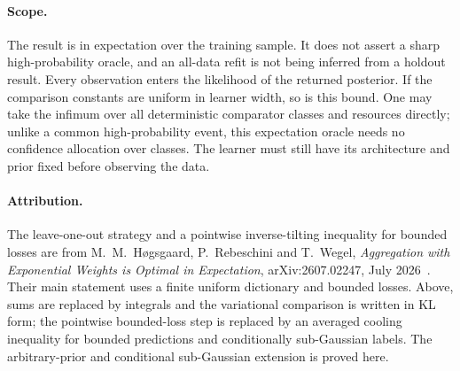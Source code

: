 \paragraph{Scope.}
The result is in expectation over the training sample. It does not
assert a sharp high-probability oracle, and an all-data refit is not
being inferred from a holdout result. Every observation enters the
likelihood of the returned posterior. If the comparison constants are
uniform in learner width, so is this bound. One may take the infimum
over all deterministic comparator classes and resources directly;
unlike a common high-probability event, this expectation oracle needs
no confidence allocation over classes. The learner must still have
its architecture and prior fixed before observing the data.

\paragraph{Attribution.}
The leave-one-out strategy and a pointwise inverse-tilting inequality
for bounded losses are from M.~M.~H\o gsgaard, P.~Rebeschini and
T.~Wegel, \emph{Aggregation with Exponential Weights is Optimal in
Expectation}, arXiv:2607.02247, July 2026~\cite{hogsgaard}. Their main statement uses a
finite uniform dictionary and bounded losses. Above, sums are replaced
by integrals and the variational comparison is written in KL form;
the pointwise bounded-loss step is replaced by an averaged cooling
inequality for bounded predictions and conditionally sub-Gaussian
labels. The arbitrary-prior and conditional sub-Gaussian extension is proved here.
